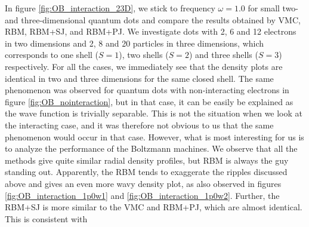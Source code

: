 In figure \eqref{fig:OB_interaction_23D}, we stick to frequency $\omega=1.0$ for small two- and three-dimensional quantum dots and compare the results obtained by VMC, RBM, RBM+SJ, and RBM+PJ. We investigate dots with 2, 6 and 12 electrons in two dimensions and 2, 8 and 20 particles in three dimensions, which corresponds to one shell ($S=1$), two shells ($S=2$) and three shells ($S=3$) respectively. For all the cases, we immediately see that the density plots are identical in two and three dimensions for the same closed shell. The same phenomenon was observed for quantum dots with non-interacting electrons in figure \eqref{fig:OB_nointeraction}, but in that case, it can be easily be explained as the wave function is trivially separable. This is not the situation when we look at the interacting case, and it was therefore not obvious to us that the same phenomenon would occur in that case. However, what is most interesting for us is to analyze the performance of the Boltzmann machines. We observe that all the methods give quite similar radial density profiles, but RBM is always the guy standing out. Apparently, the RBM tends to exaggerate the ripples discussed above and gives an even more wavy density plot, as also observed in figures \eqref{fig:OB_interaction_1p0w1} and \eqref{fig:OB_interaction_1p0w2}. Further, the RBM+SJ is more similar to the VMC and RBM+PJ, which are almost identical. This is consistent with 
